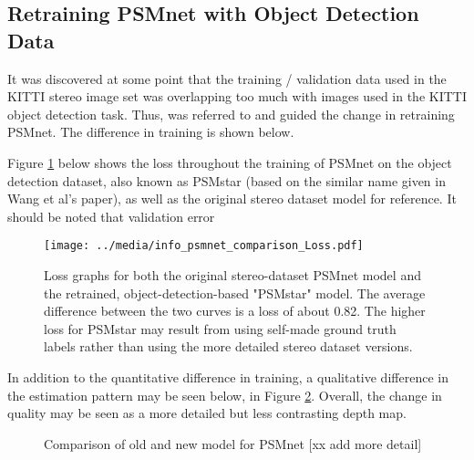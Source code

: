 \subsection{Retraining PSMnet with Object Detection Data}
It was discovered at some point that the training / validation data used in the KITTI stereo image set was overlapping too much with images used in the KITTI object detection task. Thus, \cite{wang_pseudo-lidar_2019} was referred to and guided the change in retraining PSMnet. The difference in training is shown below.

Figure \ref{psmnet_star_train_info} below shows the loss throughout the training of PSMnet on the object detection dataset, also known as PSMstar (based on the similar name given in Wang et al's paper), as well as the original stereo dataset model for reference. It should be noted that validation error 



\begin{figure}[H]
    \centering
        \texttt{[image: ../media/info\_psmnet\_comparison\_Loss.pdf]}
    \caption{Loss graphs for both the original stereo-dataset PSMnet model and the retrained, object-detection-based "PSMstar" model. The average difference between the two curves is a loss of about 0.82. The higher loss for PSMstar may result from using self-made ground truth labels rather than using the more detailed stereo dataset versions.}
    \label{psmnet_star_train_info}
\end{figure}

In addition to the quantitative difference in training, a qualitative difference in the estimation pattern may be seen below, in Figure \ref{new_psmnet}. Overall, the change in quality may be seen as a more detailed but less contrasting depth map.

\begin{figure}[H]
    \centering
    \caption{Comparison of old and new model for PSMnet [xx add more detail]}
    \label{new_psmnet}
\end{figure}



